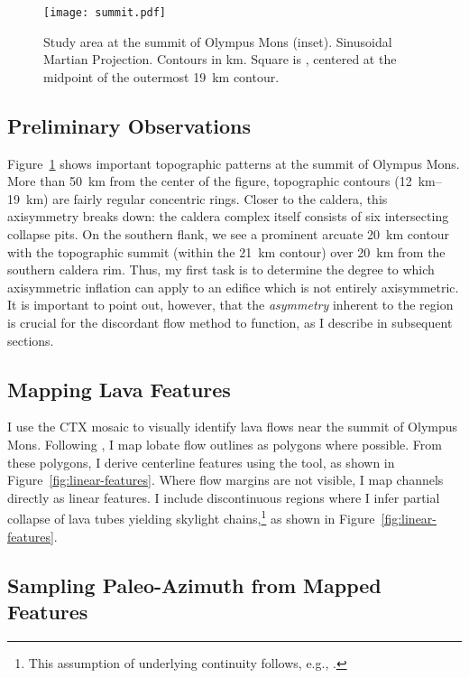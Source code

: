 \begin{figure}
    \centering
    \texttt{[image: summit.pdf]}
    \caption[Summit study area]{Study area at the summit of Olympus Mons (inset). Sinusoidal Martian Projection. Contours in \unit{km}. Square is , centered at the midpoint of the outermost \qty{19}{\km} contour.}\label{fig:summit}
\end{figure}

\subsection{Preliminary Observations}

Figure~\ref{fig:summit} shows important topographic patterns at the summit of Olympus Mons. More than \qty{50}{\km} from the center of the figure, topographic contours (\qtyrange{12}{19}{\km}) are fairly regular concentric rings. Closer to the caldera, this axisymmetry breaks down: the caldera complex itself consists of six intersecting collapse pits. On the southern flank, we see a prominent arcuate \qty{20}{\km} contour with the topographic summit (within the \qty{21}{\km} contour) over \qty{20}{\km} from the southern caldera rim. Thus, my first task is to determine the degree to which axisymmetric inflation can apply to an edifice which is not entirely axisymmetric. It is important to point out, however, that the \emph{asymmetry} inherent to the region is crucial for the discordant flow method to function, as I describe in subsequent sections. 

\subsection{Mapping Lava Features}

I use the \ac{CTX} mosaic to visually identify lava flows near the summit of Olympus Mons. Following \textcite{mouginis-mark_geologic_2021}, I map lobate flow outlines as polygons where possible. From these polygons, I derive centerline features using the  tool, as shown in Figure~\ref{fig:linear-features}. Where flow margins are not visible, I map channels directly as linear features. I include discontinuous regions where I infer partial collapse of lava tubes yielding skylight chains,\footnote{This assumption of underlying continuity follows, e.g., \textcite{bleacher_olympus_2007,carr_geologic_2010,peters_lava_2021}.} as shown in Figure~\ref{fig:linear-features}.

\subsection{Sampling Paleo-Azimuth from Mapped Features}

